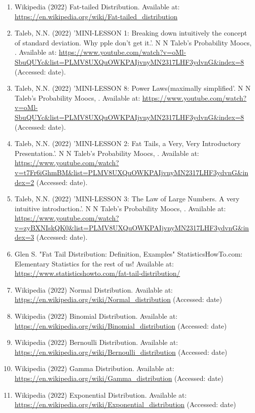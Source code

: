 \documentclass[14pt, a4paper]{article}
\theoremstyle{definition}
\begin{document}
\begin{enumerate}
    \item Wikipedia (2022) Fat-tailed Distribution. Available at: \url{https://en.wikipedia.org/wiki/Fat-tailed_distribution}
    \item Taleb, N.N. (2022) 'MINI-LESSON 1: Breaking down intuitively the concept of standard deviation. Why pple don't get it.'. N N Taleb’s Probability Moocs, . Available at: \url{https://www.youtube.com/watch?v=oMl-SbuQUYc&list=PLMV8UXQuOWKPAIjvnyMN2317LHF3ydvnG&index=8} (Accessed: date).
    
    \item Taleb, N.N. (2022) 'MINI-LESSON 8: Power Laws(maximally simplified'. N N Taleb’s Probability Moocs, . Available at: \url{https://www.youtube.com/watch?v=oMl-SbuQUYc&list=PLMV8UXQuOWKPAIjvnyMN2317LHF3ydvnG&index=8} (Accessed: date).
    \item Taleb, N.N. (2022) 'MINI-LESSON 2: Fat Tails, a Very, Very Introductory Presentation.'. N N Taleb’s Probability Moocs, . Available at: \url{https://www.youtube.com/watch?v=t7Fr6iGhmBM&list=PLMV8UXQuOWKPAIjvnyMN2317LHF3ydvnG&index=2} (Accessed: date).
    \item Taleb, N.N. (2022) 'MINI-LESSON 3: The Law of Large Numbers. A very intuitive introduction.'. N N Taleb’s Probability Moocs, . Available at: \url{https://www.youtube.com/watch?v=zyBXNIskQK0&list=PLMV8UXQuOWKPAIjvnyMN2317LHF3ydvnG&index=3} (Accessed: date).
    \item Glen S. "Fat Tail Distribution: Definition, Examples" StatisticsHowTo.com: Elementary Statistics for the rest of us! Available at: \url{https://www.statisticshowto.com/fat-tail-distribution/}
    \item Wikipedia (2022) Normal Distribution. Available at: \url{https://en.wikipedia.org/wiki/Normal_distribution} (Accessed: date)
    \item Wikipedia (2022) Binomial Distribution. Available at: \url{https://en.wikipedia.org/wiki/Binomial_distribution} (Accessed: date)
    \item Wikipedia (2022) Bernoulli Distribution. Available at: \url{https://en.wikipedia.org/wiki/Bernoulli_distribution} (Accessed: date)
    \item Wikipedia (2022) Gamma Distribution. Available at: \url{https://en.wikipedia.org/wiki/Gamma_distribution} (Accessed: date)
    \item Wikipedia (2022) Exponential Distribution. Available at: \url{https://en.wikipedia.org/wiki/Exponential_distribution} (Accessed: date)

\end{enumerate}
\end{document}
